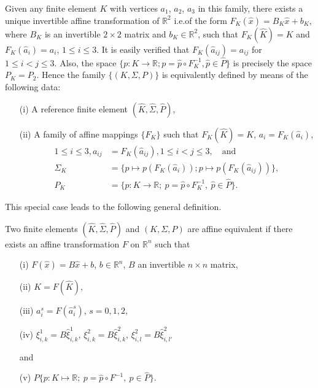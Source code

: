 Given any finite element $K$ with vertices $a_{1}$, $a_{2}$, $a_{3}$
in this family, there exists a unique invertible affine transformation
of $\mathbb{R}^{2}$ i.e.\@ of the form
$F_{K}(\hat{x})=B_{K}\hat{x}+b_{K}$, where $B_{K}$ is an invertible
$2\times 2$ matrix and $b_{K}\in \mathbb{R}^{2}$, such\pageoriginale 
that $F_{K}(\hat{K})=K$ and $F_{K}(\hat{a}_{i})=a_{i}$, $1\leq i\leq
3$. It is easily verified that $F_{K}(\hat{a}_{ij})=a_{ij}$ for $1\leq
i<j\leq 3$. Also, the space $\{p:K\to \mathbb{R}; p=\hat{p}\circ
F^{-1}_{K},\hat{p}\in\hat{P}\}$ is precisely the space
$P_{K}=P_{2}$. Hence the family $\{(K,\Sigma,P)\}$ is equivalently
defined by means of the following data:
\begin{itemize}
\item[(i)] A reference finite element
  $(\hat{K},\hat{\Sigma},\hat{P})$,

\item[(ii)] A family of affine mappings $\{F_{K}\}$ such that
  $F_{K}(\hat{K})=K$, $a_{i}=F_{K}(\hat{a}_{i})$,
\begin{align*}
1\leq i\leq 3, a_{ij} &= F_{K}(\hat{a}_{ij}), 1\leq i<j\leq
3,\quad\text{and}\\
\Sigma_{K} &= \{p\mapsto p(F_{K}(\hat{a}_{i})); p\mapsto
p(F_{K}(\hat{a}_{ij}))\},\\ 
P_{K} &= \{p:K\to \mathbb{R};\ p=\hat{p}\circ F^{-1}_{K},\ \hat{p}\in
\hat{P}\}. 
\end{align*}
\end{itemize}

This special case leads to the following general definition.

\begin{definition}\label{chap5-defi5.3}
Two finite elements $(\hat{K},\hat{\Sigma},\hat{P})$ and
$(K,\Sigma,P)$ are affine equivalent if there exists an affine
transformation $F$ on $\mathbb{R}^{n}$ such that 
\begin{itemize}
\item[(i)] $F(\hat{x})=B\hat{x}+b$, $b\in\mathbb{R}^{n}$, $B$ an
  invertible $n\times n$ matrix,

\item[(ii)] $K=F(\hat{K})$,

\item[(iii)] $a^{s}_{i}=F(\hat{a}^{s}_{i})$, $s=0,1,2$,

\item[(iv)] $\xi^{1}_{i,k}=B\hat{\xi}^{1}_{i,k}$,
  $\xi^{2}_{i,k}=B\hat{\xi}^{2}_{i,k}$,
  $\xi^{2}_{i,l}=B\hat{\xi}^{2}_{i,l'}$ 

and

\item[(v)] $P\{p:K\mapsto \mathbb{R};\ p=\hat{p}\circ
  F^{-1},\ \hat{p}\in\hat{P}\}$. 
\end{itemize}
\end{definition}

